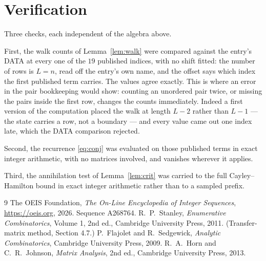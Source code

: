 \documentclass[11pt,a4paper]{article}
\theoremstyle{plain}
\theoremstyle{definition}
\begin{document}
\section{Verification}

Three checks, each independent of the algebra above.

First, the walk counts of Lemma~\ref{lem:walk} were compared against the entry's DATA at
every one of the $19$ published indices, with no shift fitted: the number of rows is
$L=n$, read off the entry's own name, and the offset says which index the first
published term carries. The values agree exactly. This is where an error in the pair
bookkeeping would show: counting an unordered pair twice, or missing the pairs inside the
first row, changes the counts immediately. Indeed a first version of the computation
placed the walk at length $L-2$ rather than $L-1$ --- the state carries a row, not a
boundary --- and every value came out one index late, which the DATA comparison rejected.

Second, the recurrence \eqref{eq:conj} was evaluated on those published terms in exact
integer arithmetic, with no matrices involved, and vanishes wherever it applies.

Third, the annihilation test of Lemma~\ref{lem:crit} was carried to the full
Cayley--Hamilton bound in exact integer arithmetic rather than to a sampled prefix.

\begin{thebibliography}{9}
 The OEIS Foundation, \emph{The On-Line Encyclopedia of Integer
Sequences}, \url{https://oeis.org}, 2026. Sequence A268764.
 R.~P.~Stanley, \emph{Enumerative Combinatorics}, Volume 1, 2nd ed.,
Cambridge University Press, 2011. (Transfer-matrix method, Section 4.7.)
 P.~Flajolet and R.~Sedgewick, \emph{Analytic Combinatorics}, Cambridge
University Press, 2009.
 R.~A.~Horn and C.~R.~Johnson, \emph{Matrix Analysis}, 2nd ed., Cambridge
University Press, 2013.
\end{thebibliography}
\end{document}
